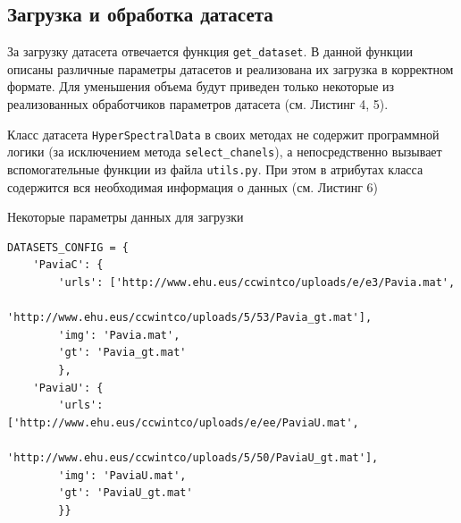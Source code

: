 \documentclass[14pt, russian]{scrartcl}
\begin{document}
\subsection{Загрузка и обработка датасета}

За загрузку датасета отвечается функция \texttt{get\_dataset}. В данной функции описаны различные параметры датасетов и реализована их загрузка в корректном формате.
Для уменьшения объема будут приведен только некоторые из реализованных обработчиков параметров датасета (см. Листинг 4, 5). 

Класс датасета \texttt{HyperSpectralData} в своих методах не содержит программной логики (за исключением метода \texttt{select\_chanels}), а непосредственно вызывает вспомогательные функции из 
файла \texttt{utils.py}. При этом в атрибутах класса содержится вся необходимая информация о данных (см. Листинг 6)

\begin{listing}[H]
    \caption{Некоторые параметры данных для загрузки}
    \label{lst:dataset_params}
    \begin{verbatim}
DATASETS_CONFIG = {
    'PaviaC': {
        'urls': ['http://www.ehu.eus/ccwintco/uploads/e/e3/Pavia.mat', 
                'http://www.ehu.eus/ccwintco/uploads/5/53/Pavia_gt.mat'],
        'img': 'Pavia.mat',
        'gt': 'Pavia_gt.mat'
        },
    'PaviaU': {
        'urls': ['http://www.ehu.eus/ccwintco/uploads/e/ee/PaviaU.mat',
               'http://www.ehu.eus/ccwintco/uploads/5/50/PaviaU_gt.mat'],
        'img': 'PaviaU.mat',
        'gt': 'PaviaU_gt.mat'
        }}
    \end{verbatim}
\end{listing}
\end{document}
